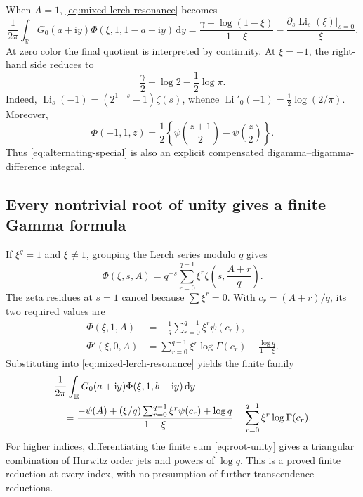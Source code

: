 \documentclass[11pt,a4paper]{article}
\theoremstyle{definition}
\numberwithin{equation}{section}
\newcommand{\R}{\mathbb R}
\newcommand{\Li}{\operatorname{Li}}
\newcommand{\dd}{\,\mathrm d}
\newcommand{\ii}{\mathrm i}
\begin{document}
When $A=1$, \eqref{eq:mixed-lerch-resonance} becomes
\begin{equation}\label{eq:mixed-Li0}
 \frac1{2\pi}\int_{\R}G_0(a+\ii y)\Phi(\xi,1,1-a-\ii y)\dd y
 =\frac{\gamma+\log(1-\xi)}{1-\xi}
       -\frac{\left.\partial_s\Li_s(\xi)\right|_{s=0}}{\xi}.
\end{equation}
At zero color the final quotient is interpreted by continuity. At
$\xi=-1$, the right-hand side reduces to
\begin{equation}\label{eq:alternating-special}
 \frac\gamma2+\log2-\frac12\log\pi.
\end{equation}
Indeed, $\Li_s(-1)=(2^{1-s}-1)\zeta(s)$, whence
$\Li'_0(-1)=\frac12\log(2/\pi)$. Moreover,
\[
 \Phi(-1,1,z)=\frac12\left\{\psi\left(\frac{z+1}{2}\right)
                           -\psi\left(\frac z2\right)\right\}.
\]
Thus \eqref{eq:alternating-special} is also an explicit compensated
digamma--digamma-difference integral.

\subsection{Every nontrivial root of unity gives a finite Gamma formula}
If $\xi^q=1$ and $\xi\ne1$, grouping the Lerch series modulo $q$ gives
\begin{equation}\label{eq:root-unity}
 \Phi(\xi,s,A)=q^{-s}\sum_{r=0}^{q-1}\xi^r
                                \zeta\left(s,\frac{A+r}{q}\right).
\end{equation}
The zeta residues at $s=1$ cancel because $\sum\xi^r=0$. With
$c_r=(A+r)/q$, its two required values are
\begin{align}
 \Phi(\xi,1,A)&=-\frac1q\sum_{r=0}^{q-1}\xi^r\psi(c_r),\label{eq:root-one}\\
 \Phi'(\xi,0,A)&=\sum_{r=0}^{q-1}\xi^r\log\Gamma(c_r)
                                      -\frac{\log q}{1-\xi}.
                                          \label{eq:root-zero-derivative}
\end{align}
Substituting into \eqref{eq:mixed-lerch-resonance} yields the finite family
\begin{align}
 &\frac1{2\pi}\int_{\R}G_0(a+\ii y)\Phi(\xi,1,b-\ii y)\dd y\notag\\
 &\quad=\frac{-\psi(A)+(\xi/q)\sum_{r=0}^{q-1}\xi^r\psi(c_r)
                      +\log q}{1-\xi}
             -\sum_{r=0}^{q-1}\xi^r\log\Gamma(c_r).
                 \label{eq:root-Gamma-pair}
\end{align}
For higher indices, differentiating the finite sum
\eqref{eq:root-unity} gives a triangular combination of Hurwitz order
jets and powers of $\log q$. This is a proved finite reduction at every
index, with no presumption of further transcendence reductions.
\end{document}
